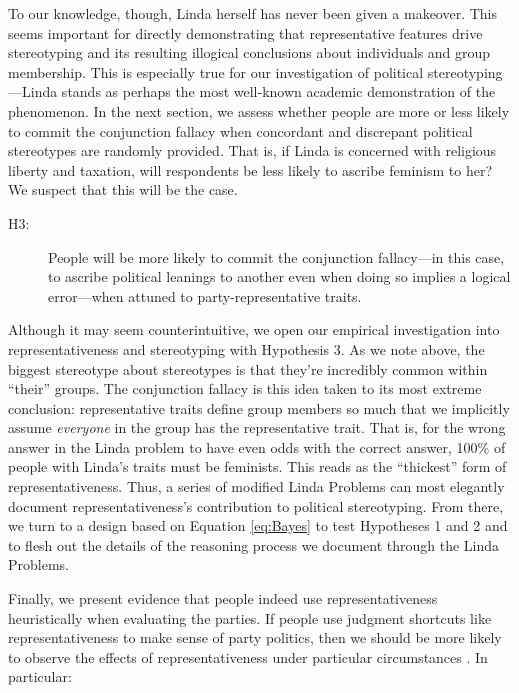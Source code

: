 \documentclass[12pt, letterpaper]{article}
\begin{document}
To our knowledge, though, Linda herself has never been given a makeover. This seems important for directly demonstrating that representative features drive stereotyping and its resulting illogical conclusions about individuals and group membership. This is especially true for our investigation of political stereotyping---Linda stands as perhaps the most well-known academic demonstration of the phenomenon. In the next section, we assess whether people are more or less likely to commit the conjunction fallacy when concordant and discrepant political stereotypes are randomly provided. That is, if Linda is concerned with religious liberty and taxation, will respondents be less likely to ascribe feminism to her? We suspect that this will be the case. 

\begin{description}
\item[H3:] People will be more likely to commit the conjunction fallacy---in this case, to ascribe political leanings to another even when doing so implies a logical error---when attuned to party-representative traits.
\end{description} 

Although it may seem counterintuitive, we open our empirical investigation into representativeness and stereotyping with Hypothesis 3. As we note above, the biggest stereotype about stereotypes is that they're incredibly common within ``their'' groups. The conjunction fallacy is this idea taken to its most extreme conclusion: representative traits define group members so much that we implicitly assume \emph{everyone} in the group has the representative trait. That is, for the wrong answer in the Linda problem to have even odds with the correct answer, 100\% of people with Linda's traits must be feminists. This reads as the ``thickest'' form of representativeness. Thus, a series of modified Linda Problems can most elegantly document representativeness's contribution to political stereotyping. From there, we turn to a design based on Equation \ref{eq:Bayes} to test Hypotheses 1 and 2 and to flesh out the details of the reasoning process we document through the Linda Problems. 

Finally, we present evidence that people indeed use representativeness heuristically when evaluating the parties. If people use judgment shortcuts like representativeness to make sense of party politics, then we should be more likely to observe the effects of representativeness under particular circumstances \citep[e.g.,][]{KahnemanFrederick2002}. In particular:
\end{document}
